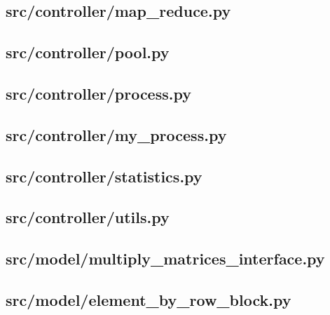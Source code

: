 \subsection{src/controller/map\_reduce.py}
	
	\newpage

\subsection{src/controller/pool.py}
	
	\newpage

\subsection{src/controller/process.py}
	
	\newpage

\subsection{src/controller/my\_process.py}
	
	\newpage

\subsection{src/controller/statistics.py}
	
	\newpage

\subsection{src/controller/utils.py}
	
	\newpage

\subsection{src/model/multiply\_matrices\_interface.py}
	
	\newpage

\subsection{src/model/element\_by\_row\_block.py}
	
	\newpage

